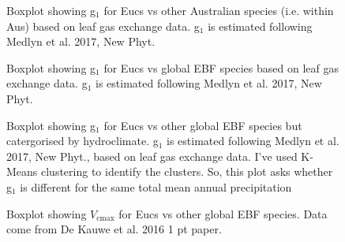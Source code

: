 \documentclass[12pt,a4paper,oneside]{article}
\begin{document}
\FloatBarrier

\begin{figure}[!hbtp]
\centering
{}
\caption{\small{Boxplot showing g$_1$ for Eucs vs other Australian species (i.e. within Aus) based on leaf gas exchange data. g$_1$ is estimated following Medlyn et al. 2017, New Phyt.}}
\label{}
\end{figure}

\FloatBarrier

\begin{figure}[!hbtp]
\centering
{}
\caption{\small{Boxplot showing g$_1$ for Eucs vs global EBF species based on leaf gas exchange data. g$_1$ is estimated following Medlyn et al. 2017, New Phyt.}}
\label{}
\end{figure}

\FloatBarrier

\begin{figure}[!hbtp]
\centering
{}
\caption{\small{Boxplot showing g$_1$ for Eucs vs other global EBF species but catergorised by hydroclimate. g$_1$ is estimated following Medlyn et al. 2017, New Phyt., based on leaf gas exchange data. I've used K-Means clustering to identify the clusters. So, this plot asks whether g$_1$ is different for the same total mean annual precipitation}}
\label{}
\end{figure}

\FloatBarrier

\begin{figure}[!hbtp]
\centering
{}
\caption{\small{Boxplot showing $V_{\mathrm{cmax}}$ for Eucs vs other global EBF species. Data come from De Kauwe et al. 2016 1 pt paper.}}
\label{}
\end{figure}
\end{document}
